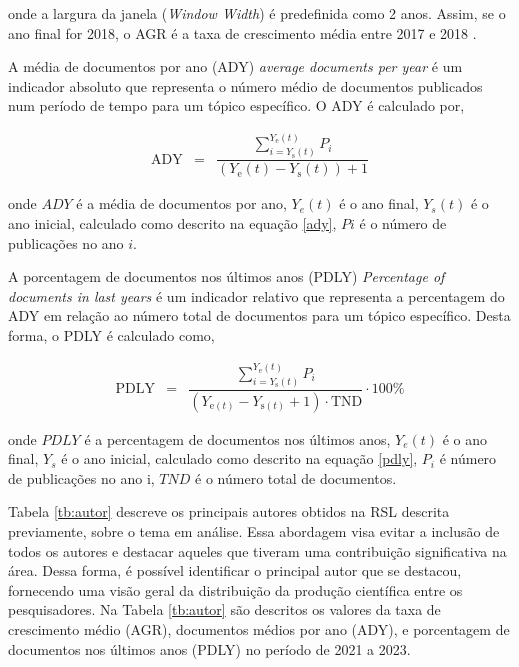 onde a largura da janela (\textit{Window Width}) é predefinida como 2 anos. Assim, se o ano final for 2018, o AGR é a taxa de crescimento média entre 2017 e 2018 \cite{scientopy}.

A média de documentos por ano (ADY) \textit{average documents per year} é um indicador absoluto que representa o número médio de documentos publicados num período de tempo para um tópico específico. O ADY é calculado por,

\begin{eqnarray}
	\mathrm{ADY}&=&\dfrac{\sum_{i={Y_{\mathrm{s}}}(t)}^{Y_{\mathrm{e}}(t)} P_i}{\left(Y_{\mathrm{e}}(t)-Y_{\mathrm{s}}(t)\right)+1}\label{ady}
\end{eqnarray}

\noindent onde $ADY$ é a média de documentos por ano, $Y_e(t)$ é o ano final, $Y_s(t)$ é o ano inicial, calculado como descrito na equação \eqref{ady}, $Pi$ é o número de publicações no ano $i$.

A porcentagem de documentos nos últimos anos (PDLY) \textit{Percentage of documents in last years} é um indicador relativo que representa a percentagem do ADY em relação ao número total de documentos para um tópico específico. Desta forma, o PDLY é calculado como,

\begin{eqnarray}
	\mathrm{PDLY}&=&\dfrac{\sum_{i={Y_{\mathrm{s}}(t)}}^{Y_{\mathrm{e}}(t)} P_i}{\left(Y_{\mathrm{e}(t)}-Y_{\mathrm{s}(t)}+1\right) \cdot \mathrm{TND}} \cdot 100 \%\label{pdly}
\end{eqnarray}

\noindent onde $PDLY$ é a percentagem de documentos nos últimos anos, $Y_e(t)$ é o ano final, $Y_s$ é o ano inicial, calculado como descrito na equação \eqref{pdly}, $P_i$ é número de publicações no ano i, $TND$ é o número total de documentos.

Tabela \ref{tb:autor} descreve os principais autores obtidos na RSL descrita previamente, sobre o tema em análise. Essa abordagem visa evitar a inclusão de todos os autores e destacar aqueles que tiveram uma contribuição significativa na área. Dessa forma, é possível identificar o principal autor que se destacou, fornecendo uma visão geral da distribuição da produção científica entre os pesquisadores. Na Tabela \ref{tb:autor} são descritos os valores da taxa de crescimento médio (AGR), documentos médios por ano (ADY), e porcentagem de documentos nos últimos anos (PDLY) no período de 2021 a 2023.

